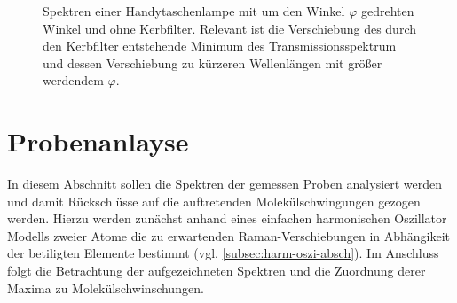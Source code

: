 \documentclass[../bericht.tex]{subfiles}
\begin{document}
        \begin{figure}[tb]
          \caption[Spektren einer Handytaschenlampe mit um den Winkel $\varphi$ gedrehten Winkel und ohne Kerbfilter.]{Spektren einer Handytaschenlampe mit um den Winkel $\varphi$ gedrehten Winkel und ohne Kerbfilter. Relevant ist die Verschiebung des durch den Kerbfilter entstehende Minimum des Transmissionsspektrum und dessen Verschiebung zu kürzeren Wellenlängen mit größer werdendem $\varphi$.}
          \label{fig:kerbfilter-spektren}
        \end{figure}


    \section{Probenanlayse}

      In diesem Abschnitt sollen die Spektren der gemessen Proben analysiert werden und damit Rückschlüsse auf die auftretenden Molekülschwingungen gezogen werden. Hierzu werden zunächst anhand eines einfachen harmonischen Oszillator Modells zweier Atome die zu erwartenden Raman-Verschiebungen in Abhängikeit der betiligten Elemente bestimmt (vgl. \cref{subsec:harm-oszi-absch}). Im Anschluss folgt die Betrachtung der aufgezeichneten Spektren und die Zuordnung derer Maxima zu Molekülschwinschungen.
\end{document}
